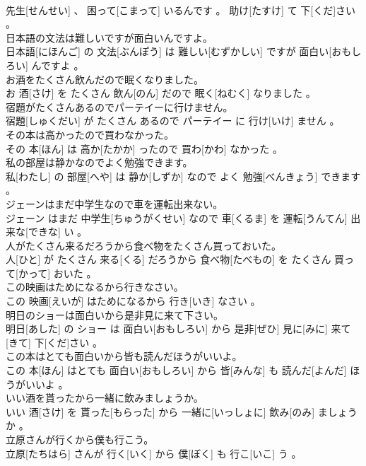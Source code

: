 \documentclass[8pt]{extreport}
\begin{document}
\begin{CJK}{UTF8}{min}
\\	先生[せんせい] 、 困って[こまって] いるんです 。 助け[たすけ] て 下[くだ]さい 。
\\	日本語の文法は難しいですが面白いんですよ。	
\\	日本語[にほんご] の 文法[ぶんぽう] は 難しい[むずかしい] ですが 面白い[おもしろい] んですよ 。
\\	お酒をたくさん飲んだので眠くなりました。	
\\	お 酒[さけ] を たくさん 飲ん[のん] だので 眠く[ねむく] なりました 。
\\	宿題がたくさんあるのでパーテイーに行けません。	
\\	宿題[しゅくだい] が たくさん あるので パーテイー に 行け[いけ] ません 。
\\	その本は高かったので買わなかった。	
\\	その 本[ほん] は 高か[たかか] ったので 買わ[かわ] なかった 。
\\	私の部屋は静かなのでよく勉強できます。	
\\	私[わたし] の 部屋[へや] は 静か[しずか] なので よく 勉強[べんきょう] できます 。
\\	ジェーンはまだ中学生なので車を運転出来ない。	
\\	ジェーン はまだ 中学生[ちゅうがくせい] なので 車[くるま] を 運転[うんてん] 出来な[できな] い 。
\\	人がたくさん来るだろうから食べ物をたくさん買っておいた。	
\\	人[ひと] が たくさん 来る[くる] だろうから 食べ物[たべもの] を たくさん 買って[かって] おいた 。
\\	この映画はためになるから行きなさい。	
\\	この 映画[えいが] はためになるから 行き[いき] なさい 。
\\	明日のショーは面白いから是非見に来て下さい。	
\\	明日[あした] の ショー は 面白い[おもしろい] から 是非[ぜひ] 見に[みに] 来て[きて] 下[くだ]さい 。
\\	この本はとても面白いから皆も読んだほうがいいよ。	
\\	この 本[ほん] はとても 面白い[おもしろい] から 皆[みんな] も 読んだ[よんだ] ほうがいいよ 。
\\	いい酒を貰ったから一緒に飲みましょうか。	
\\	いい 酒[さけ] を 貰った[もらった] から 一緒に[いっしょに] 飲み[のみ] ましょうか 。
\\	立原さんが行くから僕も行こう。	
\\	立原[たちはら] さんが 行く[いく] から 僕[ぼく] も 行こ[いこ] う 。

\end{CJK}
\end{document}
